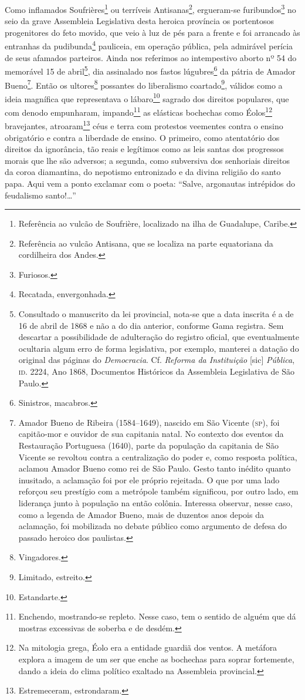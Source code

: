 Como inflamados Soufrières\footnote{Referência ao vulcão de Soufrière,
  localizado na ilha de Guadalupe, Caribe.} ou terríveis
Antisanas\footnote{Referência ao vulcão Antisana, que se localiza na
  parte equatoriana da cordilheira dos Andes.}, ergueram-se
furibundos\footnote{Furiosos.} no seio da grave Assembleia Legislativa
desta heroica província os portentosos progenitores do feto movido, que
veio à luz de pés para a frente e foi arrancado às entranhas da
pudibunda\footnote{Recatada, envergonhada.} pauliceia, em operação
pública, pela admirável perícia de seus afamados parteiros. Ainda nos
referimos ao intempestivo aborto nº 54 do memorável 15 de
abril\footnote{Consultado o manuscrito da lei provincial, nota-se que
  a data inscrita é a de 16 de abril de 1868 e não a do dia anterior, conforme
  Gama registra. Sem descartar a possibilidade de adulteração do
  registro oficial, que eventualmente ocultaria algum erro de forma
  legislativa, por exemplo, manterei a datação do original das páginas
  do \emph{Democracia}. Cf. \emph{Reforma da Instituição} {[}sic{]}
  \emph{Pública}, \textsc{id}. 2224, Ano 1868, Documentos Históricos da
  Assembleia Legislativa de São Paulo.}, dia assinalado nos fastos
lúgubres\footnote{Sinistros, macabros.} da pátria de Amador
Bueno\footnote{Amador Bueno de Ribeira (1584--1649), nascido em São
  Vicente (\textsc{sp}), foi capitão-mor e ouvidor de sua capitania natal. No
  contexto dos eventos da Restauração Portuguesa (1640), parte da
  população da capitania de São Vicente se revoltou contra a
  centralização do poder e, como resposta política, aclamou Amador Bueno
  como rei de São Paulo. Gesto tanto inédito quanto inusitado, a
  aclamação foi por ele próprio rejeitada. O que por uma lado reforçou
  seu prestígio com a metrópole também significou, por outro lado, em
  liderança junto à população na então colônia. Interessa observar,
  nesse caso, como a legenda de Amador Bueno, mais de duzentos anos
  depois da aclamação, foi mobilizada no debate público como argumento
  de defesa do passado heroico dos paulistas.}. Então os
ultores\footnote{Vingadores.} possantes do liberalismo
coartado\footnote{Limitado, estreito.}, válidos como a ideia magnífica
que representava o lábaro\footnote{Estandarte.} sagrado dos direitos
populares, que com denodo empunharam, impando\footnote{Enchendo,
  mostrando-se repleto. Nesse caso, tem o sentido de alguém que dá
  mostras excessivas de soberba e de desdém.} as elásticas bochechas
como Éolos\footnote{Na mitologia grega, Éolo era a entidade guardiã
  dos ventos. A metáfora explora a imagem de um ser que enche as
  bochechas para soprar fortemente, dando a ideia do clima político
  exaltado na Assembleia provincial.} bravejantes, atroaram\footnote{
  Estremeceram, estrondaram.} céus e terra com protestos veementes
contra o ensino obrigatório e contra a liberdade de ensino. O primeiro,
como atentatório dos direitos da ignorância, tão reais e legítimos como
as leis santas dos progressos morais que lhe são adversos; a segunda,
como subversiva dos senhoriais direitos da coroa diamantina, do
nepotismo entronizado e da divina religião do santo papa. Aqui vem a
ponto exclamar com o poeta: ``Salve, argonautas intrépidos do feudalismo
santo!\ldots{}''

